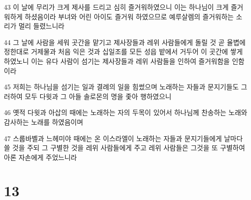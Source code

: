 \par 43 이 날에 무리가 크게 제사를 드리고 심히 즐거워하였으니 이는 하나님이 크게 즐거워하게 하셨음이라 부녀와 어린 아이도 즐거워 하였으므로 예루살렘의 즐거워하는 소리가 멀리 들렸느니라
\par 44 그 날에 사람을 세워 곳간을 맡기고 제사장들과 레위 사람들에게 돌릴 것 곧 율볍에 정한대로 거제물과 처음 익은 것과 십일조를 모든 성읍 밭에서 거두어 이 곳간에 쌓게 하였노니 이는 유다 사람이 섬기는 제사장들과 레위 사람들을 인하여 즐거워함을 인함이라
\par 45 저희는 하나님을 섬기는 일과 결례의 일을 힘썼으며 노래하는 자들과 문지기들도 그러하여 모두 다윗과 그 아들 솔로몬의 명을 좇아 행하였으니
\par 46 옛적 다윗과 아삽의 때에는 노래하는 자의 두목이 있어서 하나님께 찬송하는 노래와 감사하는 노래를 하였음이며
\par 47 스룹바벨과 느헤미야 때에는 온 이스라엘이 노래하는 자들과 문지기들에게 날마다 쓸 것을 주되 그 구별한 것을 레위 사람들에게 주고 레위 사람들은 그것을 또 구별하여 아론 자손에게 주었느니라

\chapter{13}

